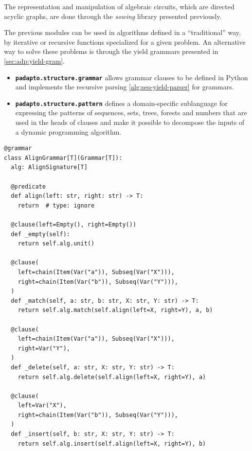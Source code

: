 The representation and manipulation of algebraic circuits, which are directed acyclic graphs, are done through the \emph{sowing} library presented previously.

The previous modules can be used in algorithms defined in a \enquote{traditional} way, by iterative or recursive functions specialized for a given problem.
An alternative way to solve these problems is through the yield grammars presented in \cref{sec:adp:yield-gram}.

\begin{itemize}
    \item \textbf{\texttt{padapto.structure.grammar}} allows grammar clauses to be defined in Python and implements the recursive parsing \cref{alg:seq-yield-parser} for grammars.
    \item \textbf{\texttt{padapto.structure.pattern}} defines a domain-specific sublanguage for expressing the patterns of sequences, sets, trees, forests and numbers that are used in the heads of clauses and make it possible to decompose the inputs of a dynamic programming algorithm.
\end{itemize}

\begin{listing}[p]
\small
\begin{verbatim}
@grammar
class AlignGrammar[T](Grammar[T]):
  alg: AlignSignature[T]

  @predicate
  def align(left: str, right: str) -> T:
    return  # type: ignore

  @clause(left=Empty(), right=Empty())
  def _empty(self):
    return self.alg.unit()

  @clause(
    left=chain(Item(Var("a")), Subseq(Var("X"))),
    right=chain(Item(Var("b")), Subseq(Var("Y"))),
  )
  def _match(self, a: str, b: str, X: str, Y: str) -> T:
    return self.alg.match(self.align(left=X, right=Y), a, b)

  @clause(
    left=chain(Item(Var("a")), Subseq(Var("X"))),
    right=Var("Y"),
  )
  def _delete(self, a: str, X: str, Y: str) -> T:
    return self.alg.delete(self.align(left=X, right=Y), a)

  @clause(
    left=Var("X"),
    right=chain(Item(Var("b")), Subseq(Var("Y"))),
  )
  def _insert(self, b: str, X: str, Y: str) -> T:
    return self.alg.insert(self.align(left=X, right=Y), b)
\end{verbatim}
    \caption[Definition of a grammar with the \emph{padapto} library]{
        Implementation of the grammar of \cref{ex:seq-align} in Python using \emph{padapto}.
        A grammar is a class descending from \texttt{Grammar} and decorated with \texttt{@grammar}.
        The class contains a method decorated with \texttt{@predicate} for each \emph{predicate} of the grammar, each argument of which corresponds to a dimension of the predicate.
        It also contains a method  for each \emph{clause} of the grammar.
        Clauses are decorated with \texttt{@clause}, giving a decomposition pattern for each of the dimensions of the associated predicate.
        \label{lst:logiciel:padapto-gram}
    }
\end{listing}

